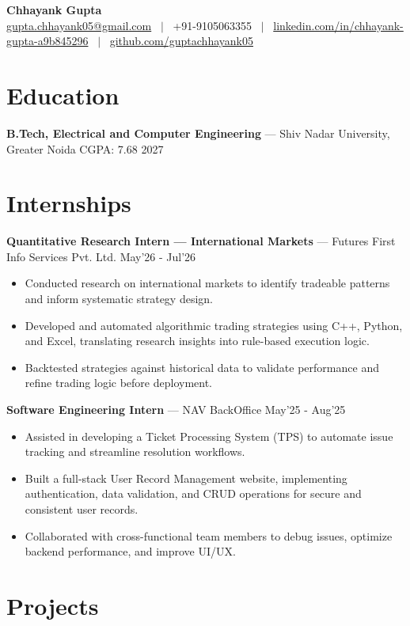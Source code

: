 \documentclass[10pt]{article}
\newcommand{\resumeItem}[1]{\item{\small #1}}
\newcommand{\resumeEntry}[3]{
  \noindent\textbf{#1} --- #2 \hfill #3\\[0.05em]
}
\begin{document}
\begin{center}
  {\LARGE \textbf{Chhayank Gupta}}\\[0.35em]
  \small
  \href{mailto:gupta.chhayank05@gmail.com}{gupta.chhayank05@gmail.com} \ $|$ \
  +91-9105063355 \ $|$ \
  \href{https://linkedin.com/in/chhayank-gupta-a9b845296/}{linkedin.com/in/chhayank-gupta-a9b845296} \ $|$ \
  \href{https://github.com/guptachhayank05}{github.com/guptachhayank05}
\end{center}
\vspace{-0.6em}

\section*{Education}
\resumeEntry{B.Tech, Electrical and Computer Engineering}{Shiv Nadar University, Greater Noida \quad CGPA: 7.68}{2027}

\section*{Internships}

\resumeEntry{Quantitative Research Intern --- International Markets}{Futures First Info Services Pvt. Ltd.}{May'26 - Jul'26}
\begin{itemize}
  \resumeItem{Conducted research on international markets to identify tradeable patterns and inform systematic strategy design.}
  \resumeItem{Developed and automated algorithmic trading strategies using C++, Python, and Excel, translating research insights into rule-based execution logic.}
  \resumeItem{Backtested strategies against historical data to validate performance and refine trading logic before deployment.}
\end{itemize}

\resumeEntry{Software Engineering Intern}{NAV BackOffice}{May'25 - Aug'25}
\begin{itemize}
  \resumeItem{Assisted in developing a Ticket Processing System (TPS) to automate issue tracking and streamline resolution workflows.}
  \resumeItem{Built a full-stack User Record Management website, implementing authentication, data validation, and CRUD operations for secure and consistent user records.}
  \resumeItem{Collaborated with cross-functional team members to debug issues, optimize backend performance, and improve UI/UX.}
\end{itemize}

\section*{Projects}
\end{document}
